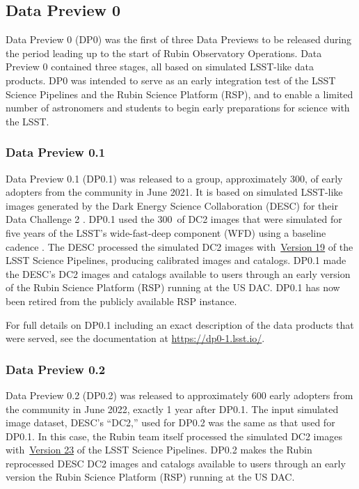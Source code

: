 \subsection{Data Preview 0}
\label{sec:dp0}

Data Preview 0 (DP0) was the first of three Data Previews to be released during the period leading up to the start of Rubin Observatory Operations.
Data Preview 0 contained three stages, all based on simulated LSST-like data products.
DP0 was intended to serve as an early integration test of the LSST Science Pipelines and the Rubin Science Platform (RSP), and to enable a limited number of astronomers and students to begin early preparations for science with the LSST.



\subsubsection{Data Preview 0.1}
\label{sec:dp01}

Data Preview 0.1 (DP0.1) was released to a group, approximately 300,  of early adopters from the community in June 2021.
It is based on simulated LSST-like images generated by the Dark Energy Science Collaboration (DESC) for their Data Challenge 2 \citep[DC2;][]{2021ApJS..253...31L}.
DP0.1 used the 300~\sqdeg of DC2 images that were simulated for five years of the LSST’s wide-fast-deep component (WFD) using a baseline cadence .
The DESC processed the simulated DC2 images with~\href{https://pipelines.lsst.io/v/v19_0_0/index.html}{Version 19} of the LSST Science Pipelines, producing calibrated images and catalogs.
DP0.1 made the DESC’s DC2 images and catalogs available to users through an early version of the Rubin Science Platform (RSP) running at the US DAC.
DP0.1 has now been retired from the publicly available RSP instance.

For full details on DP0.1 including an exact description of the data products that were served, see the documentation at \url{https://dp0-1.lsst.io/}.

\subsubsection{Data Preview 0.2}
\label{sec:dp02}

Data Preview 0.2 (DP0.2) was released to approximately 600 early adopters from the community in June 2022, exactly 1 year after DP0.1.
The input simulated image dataset, DESC's ``DC2,'' used for DP0.2 was the same as that used for DP0.1.
In this case, the Rubin team itself processed the simulated DC2 images with~\href{https://pipelines.lsst.io/v/v23_0_0/index.html}{Version 23} of the LSST Science Pipelines.
DP0.2 makes the Rubin reprocessed DESC DC2 images and catalogs available to users through an early version the Rubin Science Platform (RSP) running at the US DAC.

